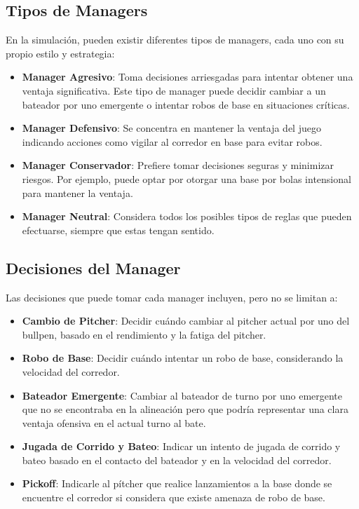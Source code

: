 \documentclass[runningheads]{llncs}
\begin{document}
    \subsection{Tipos de Managers}
        En la simulación, pueden existir diferentes tipos de managers, cada uno con su propio estilo y estrategia:
        \begin{itemize}
            \item \textbf{Manager Agresivo}: Toma decisiones arriesgadas para intentar obtener una ventaja significativa. Este tipo de manager puede decidir cambiar a un bateador por uno emergente o intentar robos de base en situaciones críticas.
            \item \textbf{Manager Defensivo}: Se concentra en mantener la ventaja del juego indicando acciones como vigilar al corredor en base para evitar robos.
            \item \textbf{Manager Conservador}: Prefiere tomar decisiones seguras y minimizar riesgos. Por ejemplo, puede optar por otorgar una base por bolas intensional para mantener la ventaja.
            \item \textbf{Manager Neutral}: Considera todos los posibles tipos de reglas que pueden efectuarse, siempre que estas tengan sentido.
        \end{itemize}

    \subsection{Decisiones del Manager}
        Las decisiones que puede tomar cada manager incluyen, pero no se limitan a:
        \begin{itemize}
            \item \textbf{Cambio de Pitcher}: Decidir cuándo cambiar al pitcher actual por uno del bullpen, basado en el rendimiento y la fatiga del pitcher.
            \item \textbf{Robo de Base}: Decidir cuándo intentar un robo de base, considerando la velocidad del corredor.
            \item \textbf{Bateador Emergente}: Cambiar al bateador de turno por uno emergente que no se encontraba en la alineación pero que podría representar una clara ventaja ofensiva en el actual turno al bate.
            \item \textbf{Jugada de Corrido y Bateo}: Indicar un intento de jugada de corrido y bateo basado en el contacto del bateador y en la velocidad del corredor.
            \item \textbf{Pickoff}: Indicarle al pítcher que realice lanzamientos a la base donde se encuentre el corredor si considera que existe amenaza de robo de base.
        \end{itemize}
\end{document}
